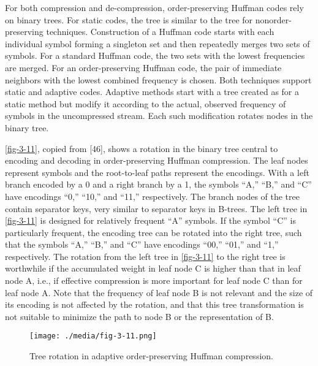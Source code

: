 For both compression and de-compression, order-preserving Huffman codes
rely on binary trees. For static codes, the tree is similar to the tree
for nonorder-preserving techniques. Construction of a Huffman code
starts with each individual symbol forming a singleton set and then
repeatedly merges two sets of symbols. For a standard Huffman code, the
two sets with the lowest frequencies are merged. For an order-preserving
Huffman code, the pair of immediate neighbors with the lowest combined
frequency is chosen. Both techniques support static and adaptive codes.
Adaptive methods start with a tree created as for a static method but
modify it according to the actual, observed frequency of symbols in the
uncompressed stream. Each such modification rotates nodes in the binary
tree.

\autoref{fig-3-11}, copied from {[}46{]}, shows a rotation in the binary tree
central to encoding and decoding in order-preserving Huffman
compression. The leaf nodes represent symbols and the root-to-leaf paths
represent the encodings. With a left branch encoded by a 0 and a right
branch by a 1, the symbols ``A,'' ``B,'' and ``C'' have encodings ``0,''
``10,'' and ``11,'' respectively. The branch nodes of the tree contain
separator keys, very similar to separator keys in B-trees. The left tree
in \autoref{fig-3-11} is designed for relatively frequent ``A'' symbols. If the
symbol ``C'' is particularly frequent, the encoding tree can be rotated
into the right tree, such that the symbols ``A,'' ``B,'' and ``C'' have
encodings ``00,'' ``01,'' and ``1,'' respectively. The rotation from the
left tree in \autoref{fig-3-11} to the right tree is worthwhile if the
accumulated weight in leaf node C is higher than that in leaf node A,
i.e., if effective compression is more important for leaf node C than
for leaf node A. Note that the frequency of leaf node B is not relevant
and the size of its encoding is not affected by the rotation, and that
this tree transformation is not suitable to minimize the path to node B
or the representation of B.

\begin{figure}
  \centering
  \texttt{[image: ./media/fig-3-11.png]}

  \caption{Tree rotation in adaptive order-preserving Huffman
  compression.\label{fig-3-11}}
\end{figure}

